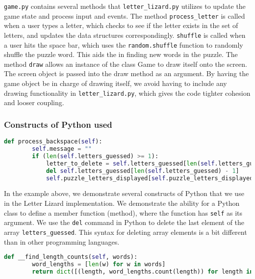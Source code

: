 	\texttt{game.py} contains several methods that \texttt{letter\_lizard.py} utilizes to update the game state and process input and events. The method \texttt{process\_letter} is called when a user types a letter, which checks to see if the letter exists in the set of letters, and updates the data structures correspondingly. \texttt{shuffle} is called when a user hits the space bar, which uses the \texttt{random.shuffle} function to randomly shuffle the puzzle word. This aids the in finding new words in the puzzle. The method \texttt{draw} allows an instance of the class Game to draw itself onto the screen. The screen object is passed into the draw method as an argument. By having the game object be in charge of drawing itself, we avoid having to include any drawing functionality in \texttt{letter\_lizard.py}, which gives the code tighter cohesion and looser coupling.
	
\subsubsection{Constructs of Python used}

\begin{lstlisting}[language=Python, %
  caption=Basic constructs of Python used.]
    def process_backspace(self):
        self.message = ""
        if (len(self.letters_guessed) >= 1):
            letter_to_delete = self.letters_guessed[len(self.letters_guessed) - 1]
            del self.letters_guessed[len(self.letters_guessed) - 1]
            self.puzzle_letters_displayed[self.puzzle_letters_displayed.index('')] = letter_to_delete
\end{lstlisting}
In the example above, we demonstrate several constructs of Python that we use in the Letter Lizard implementation. We demonstrate the ability for a Python class to define a member function (method), where the function has \texttt{self} as its argument. We use the \texttt{del} command in Python to delete the last element of the array \texttt{letters\_guessed}. This syntax for deleting array elements is a bit different than in other programming languages.

\begin{lstlisting}[language=Python, %
  caption=Demonstration of functional programming constructs in Python.]
    def __find_length_counts(self, words):
        word_lengths = [len(w) for w in words]
        return dict([(length, word_lengths.count(length)) for length in set(word_lengths)])
\end{lstlisting}

